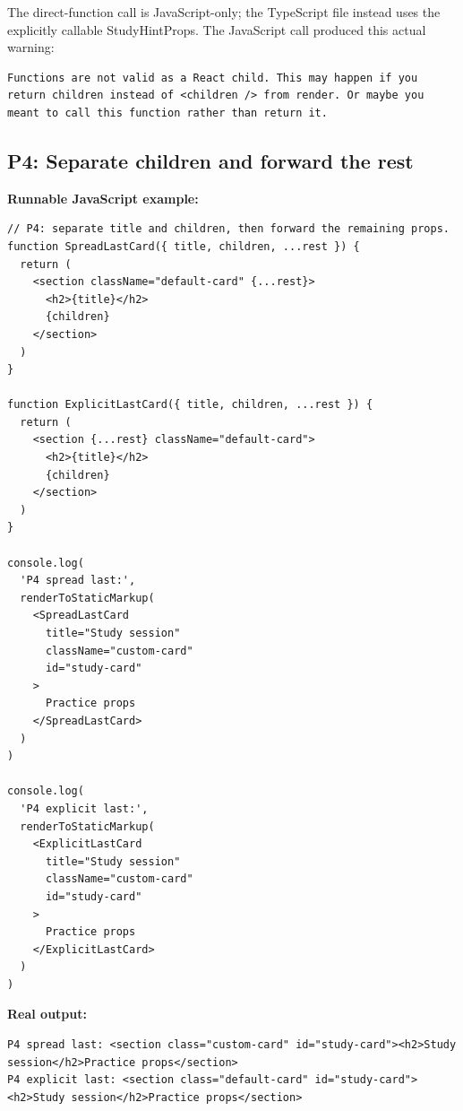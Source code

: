 \documentclass[10pt,a4paper]{article}
\begin{document}
The direct-function call is JavaScript-only; the TypeScript file instead uses the explicitly callable StudyHintProps. The JavaScript call produced this actual warning:

\begin{lstlisting}[language={}]
Functions are not valid as a React child. This may happen if you return children instead of <children /> from render. Or maybe you meant to call this function rather than return it.
\end{lstlisting}

\subsection{P4: Separate children and forward the rest}

\textbf{Runnable JavaScript example:}

\begin{lstlisting}[language=GuideJS]
// P4: separate title and children, then forward the remaining props.
function SpreadLastCard({ title, children, ...rest }) {
  return (
    <section className="default-card" {...rest}>
      <h2>{title}</h2>
      {children}
    </section>
  )
}

function ExplicitLastCard({ title, children, ...rest }) {
  return (
    <section {...rest} className="default-card">
      <h2>{title}</h2>
      {children}
    </section>
  )
}

console.log(
  'P4 spread last:',
  renderToStaticMarkup(
    <SpreadLastCard
      title="Study session"
      className="custom-card"
      id="study-card"
    >
      Practice props
    </SpreadLastCard>
  )
)

console.log(
  'P4 explicit last:',
  renderToStaticMarkup(
    <ExplicitLastCard
      title="Study session"
      className="custom-card"
      id="study-card"
    >
      Practice props
    </ExplicitLastCard>
  )
)
\end{lstlisting}


\textbf{Real output:}

\begin{lstlisting}[language={}]
P4 spread last: <section class="custom-card" id="study-card"><h2>Study session</h2>Practice props</section>
P4 explicit last: <section class="default-card" id="study-card"><h2>Study session</h2>Practice props</section>
\end{lstlisting}
\end{document}
